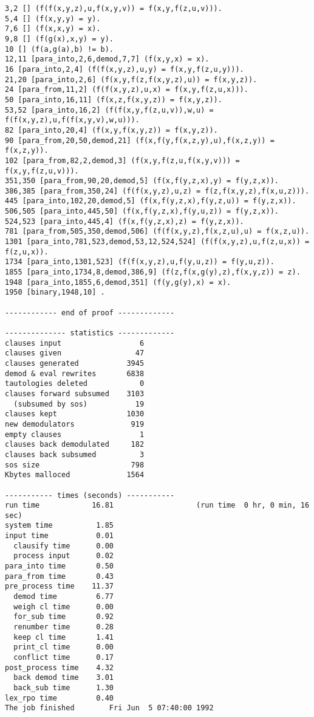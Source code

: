 {\begin{verbatim}
3,2 [] (f(f(x,y,z),u,f(x,y,v)) = f(x,y,f(z,u,v))).
5,4 [] (f(x,y,y) = y).
7,6 [] (f(x,x,y) = x).
9,8 [] (f(g(x),x,y) = y).
10 [] (f(a,g(a),b) != b).
12,11 [para_into,2,6,demod,7,7] (f(x,y,x) = x).
16 [para_into,2,4] (f(f(x,y,z),u,y) = f(x,y,f(z,u,y))).
21,20 [para_into,2,6] (f(x,y,f(z,f(x,y,z),u)) = f(x,y,z)).
24 [para_from,11,2] (f(f(x,y,z),u,x) = f(x,y,f(z,u,x))).
50 [para_into,16,11] (f(x,z,f(x,y,z)) = f(x,y,z)).
53,52 [para_into,16,2] (f(f(x,y,f(z,u,v)),w,u) = f(f(x,y,z),u,f(f(x,y,v),w,u))).
82 [para_into,20,4] (f(x,y,f(x,y,z)) = f(x,y,z)).
90 [para_from,20,50,demod,21] (f(x,f(y,f(x,z,y),u),f(x,z,y)) = f(x,z,y)).
102 [para_from,82,2,demod,3] (f(x,y,f(z,u,f(x,y,v))) = f(x,y,f(z,u,v))).
351,350 [para_from,90,20,demod,5] (f(x,f(y,z,x),y) = f(y,z,x)).
386,385 [para_from,350,24] (f(f(x,y,z),u,z) = f(z,f(x,y,z),f(x,u,z))).
445 [para_into,102,20,demod,5] (f(x,f(y,z,x),f(y,z,u)) = f(y,z,x)).
506,505 [para_into,445,50] (f(x,f(y,z,x),f(y,u,z)) = f(y,z,x)).
524,523 [para_into,445,4] (f(x,f(y,z,x),z) = f(y,z,x)).
781 [para_from,505,350,demod,506] (f(f(x,y,z),f(x,z,u),u) = f(x,z,u)).
1301 [para_into,781,523,demod,53,12,524,524] (f(f(x,y,z),u,f(z,u,x)) = f(z,u,x)).
1734 [para_into,1301,523] (f(f(x,y,z),u,f(y,u,z)) = f(y,u,z)).
1855 [para_into,1734,8,demod,386,9] (f(z,f(x,g(y),z),f(x,y,z)) = z).
1948 [para_into,1855,6,demod,351] (f(y,g(y),x) = x).
1950 [binary,1948,10] .

------------ end of proof -------------

-------------- statistics -------------
clauses input                  6
clauses given                 47
clauses generated           3945
demod & eval rewrites       6838
tautologies deleted            0
clauses forward subsumed    3103
  (subsumed by sos)           19
clauses kept                1030
new demodulators             919
empty clauses                  1
clauses back demodulated     182
clauses back subsumed          3
sos size                     798
Kbytes malloced             1564

----------- times (seconds) -----------
run time            16.81                   (run time  0 hr, 0 min, 16 sec)
system time          1.85
input time           0.01
  clausify time      0.00
  process input      0.02
para_into time       0.50
para_from time       0.43
pre_process time    11.37
  demod time         6.77
  weigh cl time      0.00
  for_sub time       0.92
  renumber time      0.28
  keep cl time       1.41
  print_cl time      0.00
  conflict time      0.17
post_process time    4.32
  back demod time    3.01
  back_sub time      1.30
lex_rpo time         0.40
The job finished        Fri Jun  5 07:40:00 1992
\end{verbatim} }
